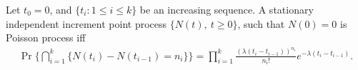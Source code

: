 \documentclass[a4paper,10pt,english]{article}
\begin{document}
\begin{prop} Let $t_0 = 0$, and $\{t_i: 1 \leq i \leq k\}$ be an increasing sequence. A stationary independent increment point process $\{N(t),~t\geqslant 0\}$, such that $N(0) = 0$ is Poisson process iff 
\begin{align*}
  \Pr\{\bigcap_{i=1}^k \{N(t_i)-N(t_{i-1})= n_{i}\}\} = \prod_{i=1}^{k}\frac{(\lambda(t_{i}-t_{i-1}))^{n_{i}}}{n_{i}!} e^{-\lambda (t_{i}-t_{i-1})}.
\end{align*}
\end{prop}
\end{document}
